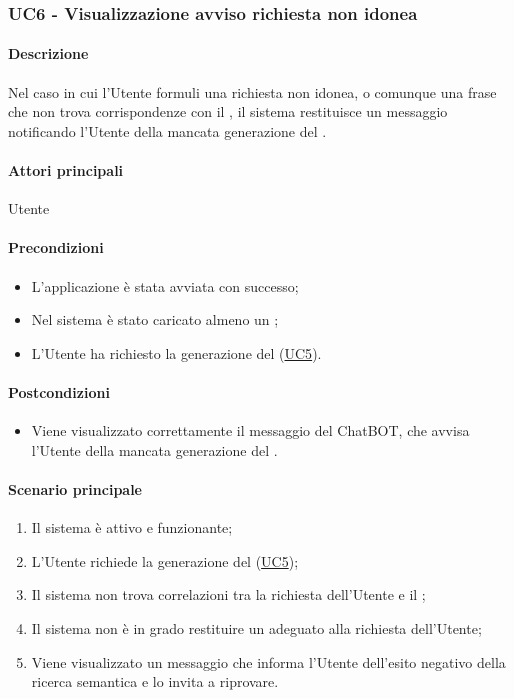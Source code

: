 \subsubsection{UC6 - Visualizzazione avviso richiesta non idonea}\label{UC6}
\paragraph*{Descrizione}
Nel caso in cui l'Utente formuli una richiesta non idonea, o comunque una frase che non trova corrispondenze con il , il sistema restituisce un messaggio notificando l'Utente della mancata generazione del .

\paragraph*{Attori principali}
Utente

\paragraph*{Precondizioni}
\begin{itemize}
  \item L'applicazione è stata avviata con successo;
  \item Nel sistema è stato caricato almeno un ;
  \item L'Utente ha richiesto la generazione del  (\hyperref[UC5]{UC5}).  
\end{itemize}

\paragraph*{Postcondizioni}
\begin{itemize}
  \item Viene visualizzato correttamente il messaggio del ChatBOT, che avvisa l'Utente della mancata generazione del .
\end{itemize}

\paragraph*{Scenario principale}
\begin{enumerate}
  \item Il sistema è attivo e funzionante;
  \item L'Utente richiede la generazione del  (\hyperref[UC5]{UC5});
  \item Il sistema non trova correlazioni tra la richiesta dell'Utente e il ;
  \item Il sistema non è in grado restituire un  adeguato alla richiesta dell'Utente;
  \item Viene visualizzato un messaggio che informa l'Utente dell'esito negativo della ricerca semantica e lo invita a riprovare.
\end{enumerate}
